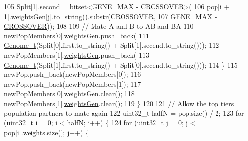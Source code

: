 \begin{DoxyCode}
105       Split[1].second = bitset<\hyperlink{_soil_math_types_8h_aa5e1eb1a998e5ed69af2076cf318df4b}{GENE\_MAX} - \hyperlink{_soil_math_types_8h_ae84e527452fcf9dfc8ef8fd0dd5cd598}{CROSSOVER}>(
106           pop[\hyperlink{_comparision_pictures_2_createtest_image_8m_a6f6ccfcf58b31cb6412107d9d5281426}{i} + 1].weightsGen[\hyperlink{_comparision_pictures_2_createtest_image_8m_ac86694252f8dfdb19aaeadc4b7c342c6}{j}].to\_string().substr(\hyperlink{_soil_math_types_8h_ae84e527452fcf9dfc8ef8fd0dd5cd598}{CROSSOVER},
107                                                       \hyperlink{_soil_math_types_8h_aa5e1eb1a998e5ed69af2076cf318df4b}{GENE\_MAX} - 
      \hyperlink{_soil_math_types_8h_ae84e527452fcf9dfc8ef8fd0dd5cd598}{CROSSOVER}));
108 
109       \textcolor{comment}{// Mate A and B to AB and BA}
110       newPopMembers[0].\hyperlink{struct_pop_member_struct_a072fadb4863e0cf77b55ad3b46b62522}{weightsGen}.push\_back(
111           \hyperlink{_soil_math_types_8h_a58f6ab36d2cb0527a73caec36d14a0e0}{Genome\_t}(Split[0].first.to\_string() + Split[1].second.to\_string()));
112       newPopMembers[1].\hyperlink{struct_pop_member_struct_a072fadb4863e0cf77b55ad3b46b62522}{weightsGen}.push\_back(
113           \hyperlink{_soil_math_types_8h_a58f6ab36d2cb0527a73caec36d14a0e0}{Genome\_t}(Split[1].first.to\_string() + Split[0].second.to\_string()));
114     \}
115     newPop.push\_back(newPopMembers[0]);
116     newPop.push\_back(newPopMembers[1]);
117     newPopMembers[0].\hyperlink{struct_pop_member_struct_a072fadb4863e0cf77b55ad3b46b62522}{weightsGen}.clear();
118     newPopMembers[1].\hyperlink{struct_pop_member_struct_a072fadb4863e0cf77b55ad3b46b62522}{weightsGen}.clear();
119   \}
120 
121   \textcolor{comment}{// Allow the top tiers population partners to mate again}
122   uint32\_t halfN = pop.size() / 2;
123   \textcolor{keywordflow}{for} (uint32\_t \hyperlink{_comparision_pictures_2_createtest_image_8m_a6f6ccfcf58b31cb6412107d9d5281426}{i} = 0; \hyperlink{_comparision_pictures_2_createtest_image_8m_a6f6ccfcf58b31cb6412107d9d5281426}{i} < halfN; \hyperlink{_comparision_pictures_2_createtest_image_8m_a6f6ccfcf58b31cb6412107d9d5281426}{i}++) \{
124     \textcolor{keywordflow}{for} (uint32\_t \hyperlink{_comparision_pictures_2_createtest_image_8m_ac86694252f8dfdb19aaeadc4b7c342c6}{j} = 0; \hyperlink{_comparision_pictures_2_createtest_image_8m_ac86694252f8dfdb19aaeadc4b7c342c6}{j} < pop[\hyperlink{_comparision_pictures_2_createtest_image_8m_a6f6ccfcf58b31cb6412107d9d5281426}{i}].weights.size(); \hyperlink{_comparision_pictures_2_createtest_image_8m_ac86694252f8dfdb19aaeadc4b7c342c6}{j}++) \{

\end{DoxyCode}
